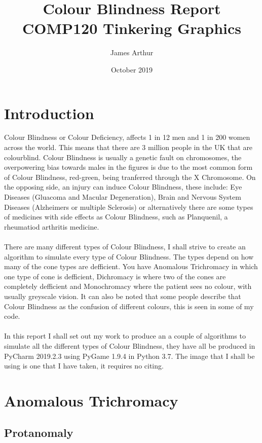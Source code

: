 \documentclass{Report}
\title{Colour Blindness Report\\[\subtitlelinesep]\smaller[\subtitlerelsize]{}COMP120 Tinkering Graphics}
\author{James Arthur}
\date{October 2019}
\begin{document}
\maketitle

\section{Introduction}
Colour Blindness or Colour Deficiency, affects 1 in 12 men and 1 in 200 women across the world.\autocite{CBA} This means that there are 3 million people in the UK that are colourblind. Colour Blindness is usually a genetic fault on chromosomes, the overpowering bias towards males in the figures is due to the most common form of Colour Blindness, red-green, being tranferred through the X Chromosome.\autocite{copsin} On the opposing side, an injury can induce Colour Blindness, these include: Eye Diseases (Gluacoma and Macular Degeneration), Brain and Nervous System Diseases (Alzheimers or multiple Sclerosis) or alternatively there are some types of medicines with side effects as Colour Blindness, such as Planquenil, a rheumatiod arthritis medicine. \autocite{NIH}\\\\

There are many different types of Colour Blindness, I shall strive to create an algorithm to simulate every type of Colour Blindness. The types depend on how many of the cone types are defficient.  You have Anomalous Trichromacy in which one type of cone is defficient, Dichromacy is where two of the cones are completely defficient and Monochromacy where the patient sees no colour, with usually greyscale vision.\autocite{Types} It can also be noted that some people describe that Colour Blindness as the confusion of different colours, this is seen in some of my code. \autocite{NHS} \\\\

In this report I shall set out my work to produce an a couple of algorithms to simulate all the different types of Colour Blindness, they have all be produced in PyCharm 2019.2.3 using PyGame 1.9.4 in Python 3.7. The image that I shall be using is one that I have taken, it requires no citing.

\newpage

\section{Anomalous Trichromacy}
\subsection{Protanomaly}
\end{document}
